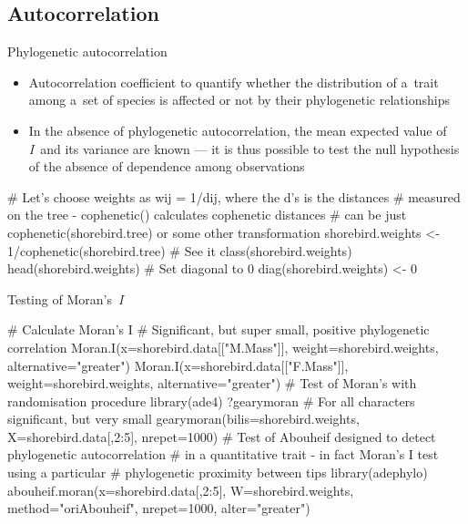\documentclass[compress, ucs, xelatex, 11pt, xcolor=svgnames, aspectratio=169,
	hyperref={
		bookmarks=true,
		unicode=true,
		colorlinks=true,
		pdftitle={Molecular data in R},
		plainpages=false,
		pdfauthor={Vojtech Zeisek},
		pdfsubject={Course about phylogeny and evolution in R},
		pdfcreator={XeLaTeX},
		pdfkeywords={R, evolution, phylogeny, molecular data},
		linkcolor=Crimson, %
		anchorcolor=Magenta, %
		citecolor=Magenta, %
		filecolor=Magenta, %
		menucolor=Magenta, %
		urlcolor=DodgerBlue, %
		pdftex},
	url={hyphens, lowtilde} %
	]{beamer}
\begin{document}
\subsection{Autocorrelation}

\begin{frame}[fragile]{Phylogenetic autocorrelation}
	\begin{itemize}
		\item Autocorrelation coefficient to quantify whether the distribution of a~trait among a~set of species is affected or not by their phylogenetic relationships
		\item In the absence of phylogenetic autocorrelation, the mean expected value of \textit{I}~and its variance are known --- it is thus possible to test the null hypothesis of the absence of dependence among observations
	\end{itemize}
	\begin{spluscode}
    # Let's choose weights as wij = 1/dij, where the d’s is the distances
    # measured on the tree - cophenetic() calculates cophenetic distances
    # can be just cophenetic(shorebird.tree) or some other transformation
    shorebird.weights <- 1/cophenetic(shorebird.tree)
    # See it
    class(shorebird.weights)
    head(shorebird.weights)
    # Set diagonal to 0
    diag(shorebird.weights) <- 0
	\end{spluscode}
\end{frame}

\begin{frame}[fragile]{Testing of Moran's~\textit{I}}
	\begin{spluscode}
    # Calculate Moran's I
    # Significant, but super small, positive phylogenetic correlation
    Moran.I(x=shorebird.data[["M.Mass"]], weight=shorebird.weights,
      alternative="greater")
    Moran.I(x=shorebird.data[["F.Mass"]], weight=shorebird.weights,
      alternative="greater")
    # Test of Moran's with randomisation procedure
    library(ade4)
    ?gearymoran
    # For all characters significant, but very small
    gearymoran(bilis=shorebird.weights, X=shorebird.data[,2:5], nrepet=1000)
    # Test of Abouheif designed to detect phylogenetic autocorrelation
    # in a quantitative trait - in fact Moran's I test using a particular
    # phylogenetic proximity between tips
    library(adephylo)
    abouheif.moran(x=shorebird.data[,2:5], W=shorebird.weights,
      method="oriAbouheif", nrepet=1000, alter="greater")
	\end{spluscode}
\end{frame}
\end{document}
